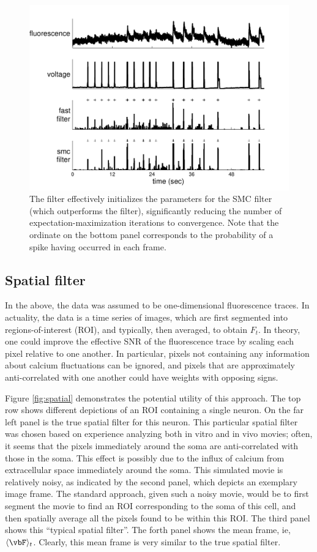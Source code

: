 \begin{figure}[h!]
\centering \includegraphics[width=.9\linewidth]{../figs/smc_init12}
\caption{The \foopsi filter effectively initializes the parameters for the SMC filter (which outperforms the \foopsi filter), significantly reducing the number of expectation-maximization iterations to convergence.  Note that the ordinate on the bottom panel corresponds to the probability of a spike having occurred in each frame.} \label{fig:smc_init}
\end{figure}

\subsection{Spatial filter}

In the above, the data was assumed to be one-dimensional fluorescence traces.  In actuality, the data is a time series of images, which are first segmented into regions-of-interest (ROI), and typically, then averaged, to obtain $F_t$.  In theory, one could improve the effective SNR of the fluorescence trace by scaling each pixel relative to one another.  In particular, pixels not containing any information about calcium fluctuations can be ignored, and pixels that are approximately anti-correlated with one another could have weights with opposing signs.  

Figure \ref{fig:spatial} demonstrates the potential utility of this approach.  The top row shows different depictions of an ROI containing a single neuron.  On the far left panel is the true spatial filter for this neuron.  This particular spatial filter was chosen based on experience analyzing both in vitro and in vivo movies; often, it seems that the pixels immediately around the soma are anti-correlated with those in the soma.  This effect is possibly due to the influx of calcium from extracellular space immediately around the soma.  This simulated movie is relatively noisy, as indicated by the second panel, which depicts an exemplary image frame.  The standard approach, given such a noisy movie, would be to first segment the movie to find an ROI corresponding to the soma of this cell, and then spatially average all the pixels found to be within this ROI.  The third panel shows this ``typical spatial filter''.  The forth panel shows the mean frame, ie, $\langle \vbF \rangle_t$.  Clearly, this mean frame is very similar to the true spatial filter.


